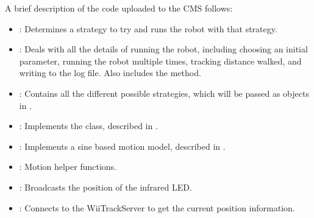 A brief description of the code uploaded to the CMS follows:

\begin{itemize}
\item {}: Determines a strategy to try and runs the robot
  with that strategy.
\item {}: Deals with all the details of running the robot,
  including choosing an initial parameter, running the robot multiple times, 
  tracking distance walked, and writing to the log file. Also includes the
   method.
\item {}: Contains all the different possible strategies, which
  will be passed as objects in . 
\item {}: Implements the  class, described in
  .
\item {}: Implements a sine based motion model,
  described in .
\item {}: Motion helper functions.
\item {}: Broadcasts the position of the infrared LED.
\item {}: Connects to the WiiTrackServer to get the current position information.
\end{itemize}
